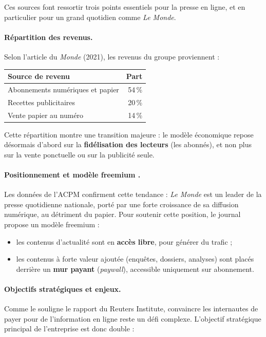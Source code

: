 \documentclass[a4paper,12pt]{article}
\begin{document}
\medskip

Ces sources font ressortir trois points essentiels pour la presse en ligne,
et en particulier pour un grand quotidien comme \emph{Le Monde}.

\paragraph{Répartition des revenus.}
Selon l'article du \emph{Monde} (2021), les revenus du groupe proviennent :

\begin{center}
\begin{tabular}{@{}lr@{}}
  \toprule
  \textbf{Source de revenu} & \textbf{Part} \\
  \midrule
  Abonnements numériques et papier & 54\,\% \\
  Recettes publicitaires            & 20\,\% \\
  Vente papier au numéro            & 14\,\% \\
  \bottomrule
\end{tabular}
\end{center}

Cette répartition montre une transition majeure : le modèle économique repose
désormais d'abord sur la \textbf{fidélisation des lecteurs} (les abonnés),
et non plus sur la vente ponctuelle ou sur la publicité seule.

\paragraph{Positionnement et modèle \og freemium \fg{}.}
Les données de l'ACPM confirment cette tendance : \emph{Le Monde} est un
leader de la presse quotidienne nationale, porté par une forte croissance de
sa diffusion numérique, au détriment du papier. Pour soutenir cette position,
le journal propose un modèle \og freemium \fg{} :

\begin{itemize}
  \item les contenus d'actualité sont en \textbf{accès libre}, pour générer du trafic ;
  \item les contenus à forte valeur ajoutée (enquêtes, dossiers, analyses)
        sont placés derrière un \textbf{mur payant} (\emph{paywall}),
        accessible uniquement sur abonnement.
\end{itemize}

\paragraph{Objectifs stratégiques et enjeux.}
Comme le souligne le rapport du Reuters Institute, convaincre les internautes
de payer pour de l'information en ligne reste un défi complexe. L'objectif
stratégique principal de l'entreprise est donc double :
\end{document}
